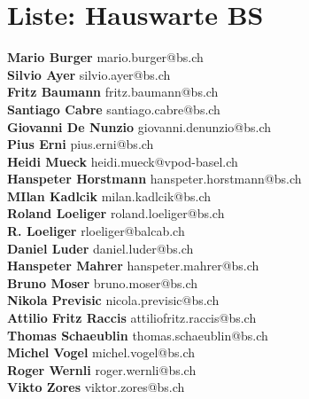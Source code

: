 \documentclass{scrartcl}
\begin{document}
\section*{Liste: Hauswarte BS}
\textbf{Mario Burger } mario.burger@bs.ch\\
\textbf{Silvio Ayer } silvio.ayer@bs.ch\\
\textbf{Fritz Baumann } fritz.baumann@bs.ch\\
\textbf{Santiago Cabre } santiago.cabre@bs.ch\\
\textbf{Giovanni De Nunzio } giovanni.denunzio@bs.ch\\
\textbf{Pius Erni } pius.erni@bs.ch\\
\textbf{Heidi Mueck                   } heidi.mueck@vpod-basel.ch\\
\textbf{Hanspeter Horstmann } hanspeter.horstmann@bs.ch\\
\textbf{MIlan Kadlcik } milan.kadlcik@bs.ch\\
\textbf{Roland Loeliger } roland.loeliger@bs.ch\\
\textbf{R. Loeliger } rloeliger@balcab.ch\\
\textbf{Daniel Luder } daniel.luder@bs.ch\\
\textbf{Hanspeter Mahrer } hanspeter.mahrer@bs.ch\\
\textbf{Bruno Moser } bruno.moser@bs.ch\\
\textbf{Nikola Previsic } nicola.previsic@bs.ch\\
\textbf{Attilio Fritz Raccis } attiliofritz.raccis@bs.ch\\
\textbf{Thomas Schaeublin } thomas.schaeublin@bs.ch\\
\textbf{Michel Vogel } michel.vogel@bs.ch\\
\textbf{Roger Wernli } roger.wernli@bs.ch\\
\textbf{Vikto Zores } viktor.zores@bs.ch\\
\end{document}
